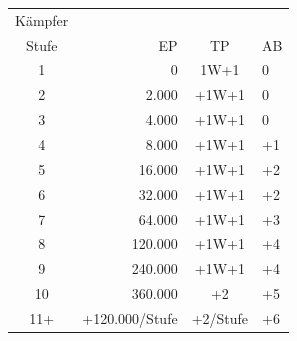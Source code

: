 \documentclass[11pt]{wbzine}
\begin{document}
\begin{tabularx}{\textwidth}{crcZ}
    Kämpfer & & & \\
    Stufe & EP & TP & AB \\
    1 & 0 & 1W+1 & 0\\
2 & 2.000 & +1W+1 & 0\\
3 & 4.000 & +1W+1 & 0\\
4 & 8.000 & +1W+1 & +1\\
5 & 16.000 & +1W+1 & +2\\
6 & 32.000 & +1W+1 & +2\\
7 & 64.000 & +1W+1 & +3\\
8 & 120.000 & +1W+1 & +4\\
9 & 240.000 & +1W+1 & +4\\
10 & 360.000 & +2 & +5\\
11+ & +120.000/Stufe & +2/Stufe & +6\\
\end{tabularx}
\end{document}
